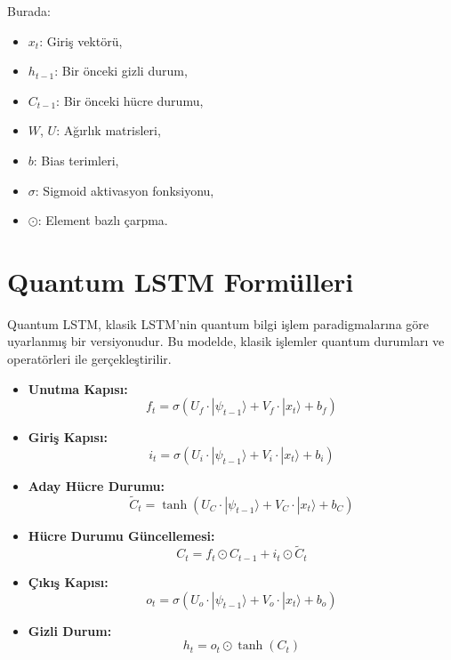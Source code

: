 \documentclass[a4paper,12pt]{article}
\begin{document}
Burada:
\begin{itemize}
    \item $x_t$: Giriş vektörü,
    \item $h_{t-1}$: Bir önceki gizli durum,
    \item $C_{t-1}$: Bir önceki hücre durumu,
    \item $W$, $U$: Ağırlık matrisleri,
    \item $b$: Bias terimleri,
    \item $\sigma$: Sigmoid aktivasyon fonksiyonu,
    \item $\odot$: Element bazlı çarpma.
\end{itemize}

\section*{Quantum LSTM Formülleri}
Quantum LSTM, klasik LSTM'nin quantum bilgi işlem paradigmalarına göre uyarlanmış bir versiyonudur. Bu modelde, klasik işlemler quantum durumları ve operatörleri ile gerçekleştirilir.

\begin{itemize}
    \item \textbf{Unutma Kapısı:}
    \begin{equation}
    f_t = \sigma(U_f \cdot |\psi_{t-1}\rangle + V_f \cdot |x_t\rangle + b_f)
    \end{equation}
    \item \textbf{Giriş Kapısı:}
    \begin{equation}
    i_t = \sigma(U_i \cdot |\psi_{t-1}\rangle + V_i \cdot |x_t\rangle + b_i)
    \end{equation}
    \item \textbf{Aday Hücre Durumu:}
    \begin{equation}
    \tilde{C}_t = \tanh(U_C \cdot |\psi_{t-1}\rangle + V_C \cdot |x_t\rangle + b_C)
    \end{equation}
    \item \textbf{Hücre Durumu Güncellemesi:}
    \begin{equation}
    C_t = f_t \odot C_{t-1} + i_t \odot \tilde{C}_t
    \end{equation}
    \item \textbf{Çıkış Kapısı:}
    \begin{equation}
    o_t = \sigma(U_o \cdot |\psi_{t-1}\rangle + V_o \cdot |x_t\rangle + b_o)
    \end{equation}
    \item \textbf{Gizli Durum:}
    \begin{equation}
    h_t = o_t \odot \tanh(C_t)
    \end{equation}
\end{itemize}
\end{document}
